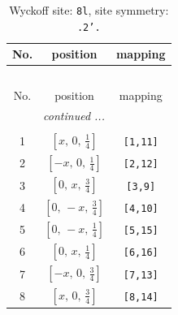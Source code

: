 \documentclass[fleqn,8pt]{jsarticle}
\begin{document}
\begin{longtable}{ccc}
\caption{Wyckoff site: {\tt 8l}, site symmetry: {\tt .2'.}}
 \\
 \hline \hline
No. & position & mapping \\ \hline \endfirsthead

\multicolumn{2}{l}{\tablename\ \thetable{}} \\
 \hline \hline
No. & position & mapping \\ \hline \endhead

 \hline \hline
\multicolumn{2}{r}{\footnotesize\it continued ...} \\ \endfoot

 \hline \hline
\multicolumn{2}{r}{} \\ \endlastfoot

1 & $\left[ x,\, 0,\, \frac{1}{4} \right]$ & {\tt [1,11]} \\ \hline
2 & $\left[ - x,\, 0,\, \frac{1}{4} \right]$ & {\tt [2,12]} \\ \hline
3 & $\left[ 0,\, x,\, \frac{3}{4} \right]$ & {\tt [3,9]} \\ \hline
4 & $\left[ 0,\, - x,\, \frac{3}{4} \right]$ & {\tt [4,10]} \\ \hline
5 & $\left[ 0,\, - x,\, \frac{1}{4} \right]$ & {\tt [5,15]} \\ \hline
6 & $\left[ 0,\, x,\, \frac{1}{4} \right]$ & {\tt [6,16]} \\ \hline
7 & $\left[ - x,\, 0,\, \frac{3}{4} \right]$ & {\tt [7,13]} \\ \hline
8 & $\left[ x,\, 0,\, \frac{3}{4} \right]$ & {\tt [8,14]} \\
\end{longtable}
\renewcommand{\arraystretch}{1.2}
\end{document}
